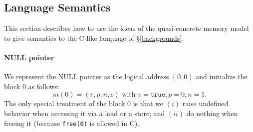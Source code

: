 















\subsection{Language Semantics}

This section describes how to use the ideas of the quasi-concrete memory model to give semantics to the C-like language of \S\ref{backgrounds}.

\paragraph{NULL pointer} 
We represent the NULL pointer as the logical address $(0,0)$ and 
initialize the block $0$ as follows:
\[
m(0) = (v,p,n,c) \text{ with } v=\texttt{true}, p=0, n=1.
\]
The only special treatment of the block $0$ is that we $(i)$ raise
undefined behavior when accessing it via a load or a store;
and $(ii)$ do nothing when freeing it (because \texttt{free(0)} is allowed in C).

